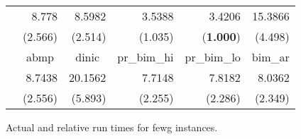 \documentclass{article}
\begin{document}
\begin{figure}[ht]
\begin{center}
\begin{scriptsize}
\begin{tabular}{||c|r|r|r|r|r||}
    &   8.778   &   8.5982  &   3.5388  &   3.4206  &   15.3866 \\
    &   (2.566) &   (2.514) &   (1.035) &   ({\bf 1.000})   &   (4.498) \\  \cline{2-6}
    &   \multicolumn{1}{|c|}{{\sf abmp}}    &   \multicolumn{1}{|c|}{{\sf dinic}}   &   \multicolumn{1}{|c|}{{\sf pr\_bim\_hi}} &   \multicolumn{1}{|c|}{{\sf pr\_bim\_lo}} &   \multicolumn{1}{|c||}{{\sf bim\_ar}}    \\  \cline{2-6}
    &   8.7438  &   20.1562 &   7.7148  &   7.8182  &   8.0362  \\
    &   (2.556) &   (5.893) &   (2.255) &   (2.286) &   (2.349) \\  \hline
\hline
\end{tabular}
\end{scriptsize}
\caption{\label{Figure:fewgscaling} Actual and relative run times for {\sf fewg} instances.}
\end{center}
\end{figure}
\end{document}

